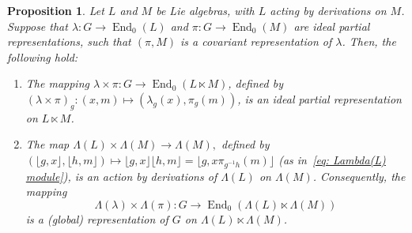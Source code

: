 \documentclass[11pt]{amsart}
\numberwithin{equation}{section}
\newtheorem{proposition}[theorem]{Proposition}
\theoremstyle{definition}
\theoremstyle{remark}
\begin{document}
\begin{proposition}\label{p:pr of semidirect product}
    Let $L$ and $M$ be Lie algebras, with $L$ acting by derivations  on $M$. Suppose that \(\lambda: G \to \operatorname{End}_0(L)\) and $\pi: G\to \operatorname{End}_0(M)$ are  ideal partial representations, such that  \((\pi, M)\) is a covariant representation of \(\lambda\). Then, the following  hold:
    \begin{enumerate}
        \item The mapping $\lambda\times \pi: G\to \operatorname{End}_0 (L \ltimes M)$, defined by $(\lambda\times \pi)_g: (x,m)\mapsto (\lambda_g(x),\pi_g(m))$, is  an ideal partial representation on \(L\ltimes M\).
        \item The map  
            $\Lambda(L) \times \Lambda(M) \to \Lambda(M),$ defined  by $ 
            (\lfloor g, x \rfloor, \lfloor h, m \rfloor) \mapsto \lfloor g, x \rfloor \lfloor h, m \rfloor = \lfloor g, x \pi_{g^{-1}h}(m) \rfloor$ (as in~\eqref{eq: Lambda(L) module}), is an action by derivations of $\Lambda(L)$ on $\Lambda(M)$. Consequently, the mapping $$\Lambda(\lambda)\times \Lambda(\pi): G\to  \operatorname{End}_{0}(\Lambda(L)\ltimes \Lambda(M))$$ is a (global) representation of $G$ on $\Lambda(L)\ltimes \Lambda(M)$.
    \end{enumerate}
\end{proposition}
\end{document}
